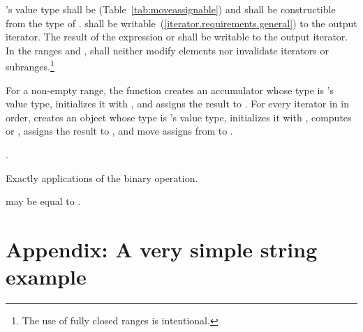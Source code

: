 \documentclass[ebook,11pt,article]{memoir}
\begin{document}
\begin{itemdescr}
\pnum
\requires
{}'s value type shall be  (Table~\ref{tab:moveassignable})
and shall be constructible from the type of .  shall be
writable~(\ref{iterator.requirements.general}) to the  output iterator. The result of the expression \added{\tcode{)}}
or \added{\tcode{)}}\tcode{)} shall be writable to the  output iterator.
In the ranges
and
,
shall neither modify elements nor invalidate iterators or
subranges.\footnote{The use of fully closed ranges is intentional.}

\pnum
\effects For a non-empty range,
the function creates an accumulator  whose type is 's
value type, initializes it with ,
and assigns the result to . For every iterator  in 
in order, creates an object  whose type is 's value type, initializes it
with , computes \added{\tcode{)}}\tcode{} 
or \added{\tcode{)}}\tcode{)}, assigns the result
to , and move assigns from  to .

\pnum
\returns
{}.

\pnum
\complexity
Exactly
applications of
the binary operation.

\pnum
\remarks
{}
may be equal to
.
\end{itemdescr}

\newpage
\chapter{Appendix: A very simple string example}
\end{document}
